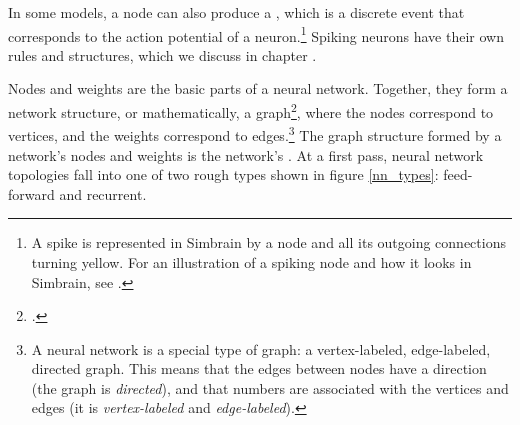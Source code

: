 In some models, a node can also produce a , which is a discrete event that corresponds to the action potential of a neuron.\footnote{A spike is represented in Simbrain by a node and all its outgoing connections turning yellow. For an illustration of a spiking node and how it looks in Simbrain, see .}  Spiking neurons have their own rules and structures, which we discuss in chapter .

Nodes and weights are the basic parts of a neural network. Together, they form a network structure, or mathematically, a graph\footnote{.}, where the nodes correspond to vertices, and the weights correspond to edges.\footnote{A neural network is a special type of graph: a vertex-labeled, edge-labeled, directed graph. This means that the edges between nodes have a direction (the graph is \emph{directed}), and that numbers are associated with the vertices and edges (it is \emph{vertex-labeled} and \emph{edge-labeled}).}  The graph structure formed by a network's nodes and weights is the network's . At a first pass, neural network topologies fall into one of two rough types shown in figure \ref{nn_types}: feed-forward and recurrent. 

